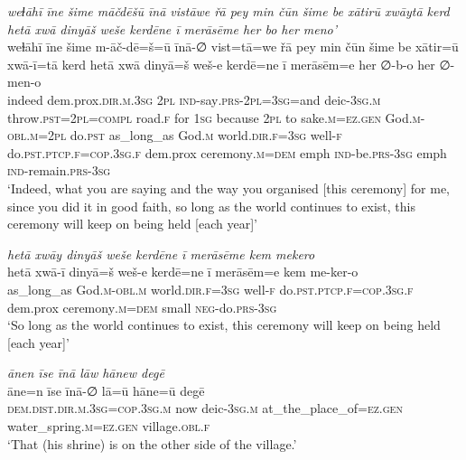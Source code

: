 \ea \label{ZP.128}
\textit{weɫāhī īne šime māčdēšū īnā vistāwe řā pey min čūn šime be xātirū xwāytā kerd hetā xwā dinyāš weše kerdēne ī merāsēme her bo her meno’} \\ 
\gll weɫāhī īne šime m-āč-dē=š=ū īnā-∅ vist=tā=we řā pey min čūn šime be xātir=ū xwā-ī=tā kerd hetā xwā dinyā=š weš-e kerdē=ne ī merāsēm=e her ∅-b-o her ∅-men-o \\ 
 indeed dem.prox\textsc{.dir}\textsc{.m}\textsc{.3sg} \textsc{2pl} \textsc{ind-}say\textsc{.prs}-\textsc{2pl}\textsc{=3sg}=and deic\textsc{-3sg}\textsc{.m} throw\textsc{.pst}=\textsc{2pl}\textsc{=compl} road\textsc{.f} for \textsc{1sg} because \textsc{2pl} to sake\textsc{.m}\textsc{\textsc{=ez.gen}} God\textsc{.m}\textsc{-obl}\textsc{.m}=\textsc{2pl} do\textsc{.pst} as\_long\_as God\textsc{.m} world\textsc{.dir}\textsc{.f}\textsc{=3sg} well\textsc{-f} do\textsc{.pst}\textsc{.ptcp}\textsc{.f}\textsc{=cop}\textsc{.3sg}\textsc{.f} dem.prox ceremony\textsc{.m}\textsc{=dem} emph \textsc{ind-}be\textsc{.prs}\textsc{-3sg} emph \textsc{ind-}remain\textsc{.prs}\textsc{-3sg} \\ 
\glt `Indeed, what you are saying and the way you organised [this ceremony] for me, since you did it in good faith, so long as the world continues to exist, this ceremony will keep on being held [each year]'
\z 
 
\ea \label{ZP.130}
\textit{hetā xwāy dinyāš weše kerdēne ī merāsēme kem mekero} \\ 
\gll hetā xwā-ī dinyā=š weš-e kerdē=ne ī merāsēm=e kem me-ker-o \\ 
 as\_long\_as God\textsc{.m}\textsc{-obl}\textsc{.m} world\textsc{.dir}\textsc{.f}\textsc{=3sg} well\textsc{-f} do\textsc{.pst}\textsc{.ptcp}\textsc{.f}\textsc{=cop}\textsc{.3sg}\textsc{.f} dem.prox ceremony\textsc{.m}\textsc{=dem} small \textsc{neg-}do\textsc{.prs}\textsc{-3sg} \\ 
\glt `So long as the world continues to exist, this ceremony will keep on being held [each year]'
\z 
 
\ea \label{ŽP.6}
\textit{ānen īse īnā lāw hānew degē} \\ 
\gll āne=n īse īnā-∅ lā=ū hāne=ū degē \\ 
 \textsc{dem.dist}\textsc{.dir}\textsc{.m}\textsc{.3sg}\textsc{=cop}\textsc{.3sg}\textsc{.m} now deic\textsc{-3sg}\textsc{.m} at\_the\_place\_of\textsc{\textsc{=ez.gen}} water\_spring\textsc{.m}\textsc{\textsc{=ez.gen}} village\textsc{.obl}\textsc{.f} \\ 
\glt `That (his shrine) is on the other side of the village.'
\z 
 
